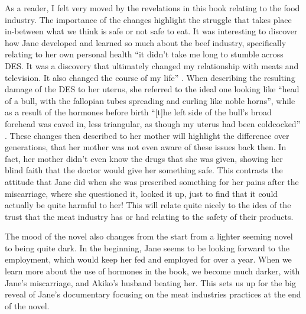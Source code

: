 \documentclass{article}
\begin{document}

As a reader, I felt very moved by the revelations in this book relating to
the food industry.
The importance of the changes highlight the struggle that takes
place in-between what we think is safe or not safe to eat. It was
interesting to discover how Jane developed and learned so much about the
beef industry, specifically relating to her own personal health ``it
didn't take me long to stumble across DES. It was a discovery that
ultimately changed my relationship with meats and television. It also
changed the course of my life'' \cite{ozeki1998my}. When describing the
resulting damage of the DES to her uterus, she referred to the ideal one
looking like ``head of a bull, with the fallopian tubes spreading and
curling like noble horns'', while as a result of the hormones before birth
``[t]he left side of the bull’s broad forehead was caved in, less
triangular, as though my uterus had been coldcocked'' \cite{ozeki1998my}.
These changes then described to her mother will highlight the difference
over generations, that her mother was not even aware of these issues back
then. In fact, her mother didn't even know the drugs that she was given,
showing her blind faith that the doctor would give her something safe. This
contrasts the attitude that Jane did when she was prescribed something for
her pains after the miscarriage, where she questioned it, looked it up, just
to find that it could actually be quite harmful to her! This will relate
quite nicely to the idea of the trust that the meat industry has or had
relating to the safety of their products.

The mood of the novel also changes from the start from a lighter seeming
novel to being quite dark. In the beginning, Jane seems to be looking
forward to the employment, which would keep her fed and employed for over a
year. When we learn more about the use of hormones in the book, we become
much darker, with Jane's miscarriage, and Akiko's husband beating her. This
sets us up for the big reveal of Jane's documentary focusing on the meat
industries practices at the end of the novel.
\end{document}
